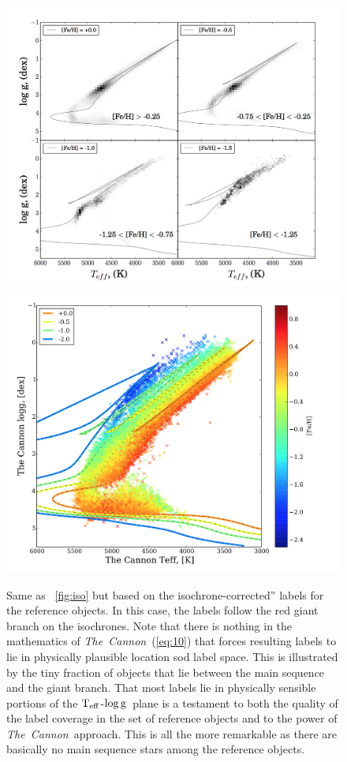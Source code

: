 \documentclass[12pt, preprint]{aastex}
\newcommand{\teff}{\mbox{$\rm T_{eff}$}}
\newcommand{\logg}{\mbox{$\rm \log g$}}
\newcommand{\tc}{\textsl{The~Cannon}}
\begin{document}
\begin{figure}[!h]
      \includegraphics[scale=0.25]{./plots/iso2.png}
  \hspace{-20pt}
    \includegraphics[scale=0.25]{./plots/iso2a.png}
\caption{Same as \figurename~\ref{fig:iso} but based on the isochrone-corrected'' labels for the reference objects. In this case, the labels follow the red giant branch on the isochrones. Note that there is nothing in the mathematics of \tc\ (\ref{eq:10}) that forces resulting labels to lie in physically plausible location sod label space. This is illustrated by the tiny fraction of objects that lie between the main sequence and the giant branch. That most labels lie in physically sensible portions of the \teff-\logg\ plane is a testament to both the quality of the label coverage in the set of reference objects and to the power of \tc\ approach. This is all the more remarkable as there are basically no main sequence stars among the reference objects.}
\label{fig:iso2}
\end{figure}
\end{document}
